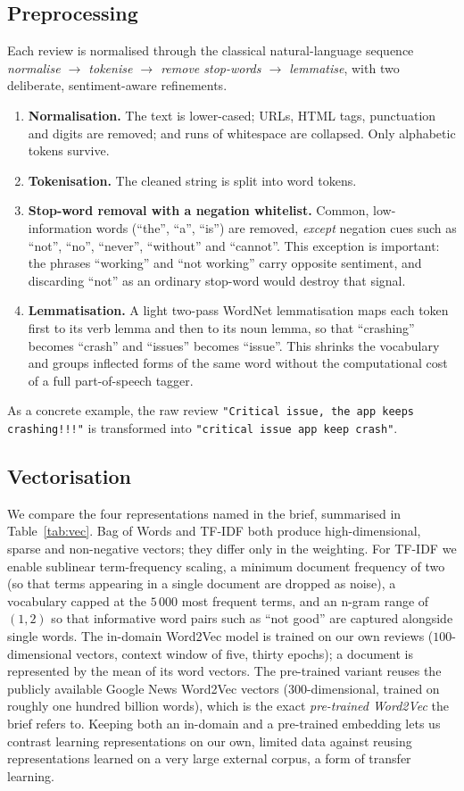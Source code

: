 \documentclass[11pt,a4paper]{article}
\begin{document}
\subsection{Preprocessing}
Each review is normalised through the classical natural-language sequence
\emph{normalise $\rightarrow$ tokenise $\rightarrow$ remove stop-words $\rightarrow$
lemmatise}, with two deliberate, sentiment-aware refinements.
\begin{enumerate}[leftmargin=1.6em,itemsep=2pt]
\item \textbf{Normalisation.} The text is lower-cased; URLs, HTML tags, punctuation and
digits are removed; and runs of whitespace are collapsed. Only alphabetic tokens
survive.
\item \textbf{Tokenisation.} The cleaned string is split into word tokens.
\item \textbf{Stop-word removal with a negation whitelist.} Common, low-information
words (``the'', ``a'', ``is'') are removed, \emph{except} negation cues such as
``not'', ``no'', ``never'', ``without'' and ``cannot''. This exception is important:
the phrases ``working'' and ``not working'' carry opposite sentiment, and discarding
``not'' as an ordinary stop-word would destroy that signal.
\item \textbf{Lemmatisation.} A light two-pass WordNet lemmatisation maps each token
first to its verb lemma and then to its noun lemma, so that ``crashing'' becomes
``crash'' and ``issues'' becomes ``issue''. This shrinks the vocabulary and groups
inflected forms of the same word without the computational cost of a full
part-of-speech tagger.
\end{enumerate}
As a concrete example, the raw review \texttt{"Critical issue, the app keeps
crashing!!!"} is transformed into \texttt{"critical issue app keep crash"}.

\subsection{Vectorisation}
\label{sec:vec}
We compare the four representations named in the brief, summarised in
Table~\ref{tab:vec}. Bag of Words and TF-IDF both produce high-dimensional, sparse and
non-negative vectors; they differ only in the weighting. For TF-IDF we enable
sublinear term-frequency scaling, a minimum document frequency of two (so that terms
appearing in a single document are dropped as noise), a vocabulary capped at the
$5\,000$ most frequent terms, and an n-gram range of $(1,2)$ so that informative word
pairs such as ``not good'' are captured alongside single words. The in-domain Word2Vec
model is trained on our own reviews ($100$-dimensional vectors, context window of five,
thirty epochs); a document is represented by the mean of its word vectors. The
pre-trained variant reuses the publicly available Google News Word2Vec vectors
($300$-dimensional, trained on roughly one hundred billion words), which is the exact
\emph{pre-trained Word2Vec} the brief refers to. Keeping both an in-domain and a
pre-trained embedding lets us contrast learning representations on our own, limited data
against reusing representations learned on a very large external corpus, a form of
transfer learning.
\end{document}
